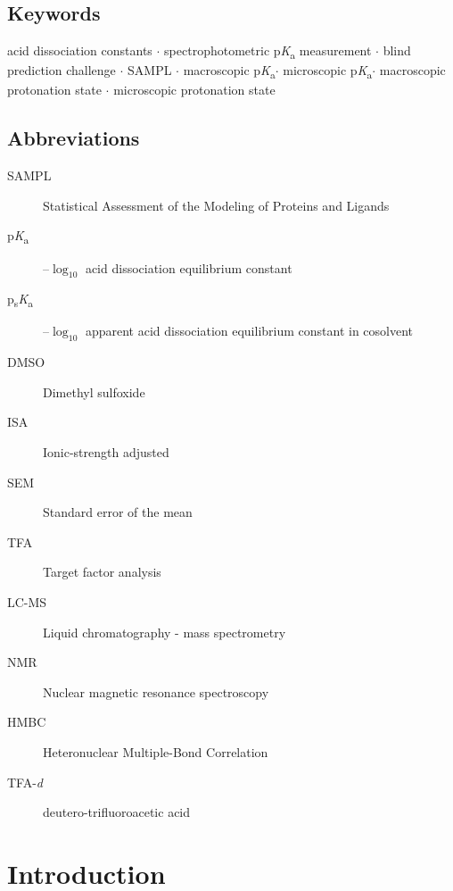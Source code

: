 \documentclass[9pt,lineno]{elife}
\newcommand{\pKa}{p\textit{K}\textsubscript{a}}
\newcommand{\psKa}{p\textsubscript{s}\textit{K}\textsubscript{a}}
\begin{document}
\subsection{Keywords}
acid dissociation constants $\cdot$ spectrophotometric \pKa{} measurement $\cdot$ blind prediction challenge $\cdot$ SAMPL $\cdot$ macroscopic \pKa $\cdot$ microscopic \pKa  $\cdot$ macroscopic protonation state $\cdot$ microscopic protonation state

\subsection{Abbreviations}
\begin{description}
\item[SAMPL] Statistical Assessment of the Modeling of Proteins and Ligands
\item[\pKa]  --${\log_{10}}$ acid dissociation equilibrium constant 
\item[\psKa] --${\log_{10}}$ apparent acid dissociation equilibrium constant in cosolvent
\item[DMSO] Dimethyl sulfoxide
\item[ISA] Ionic-strength adjusted
\item[SEM] Standard error of the mean
\item[TFA] Target factor analysis
\item[LC-MS] Liquid chromatography - mass spectrometry
\item[NMR] Nuclear magnetic resonance spectroscopy
\item[HMBC] Heteronuclear Multiple-Bond Correlation
\item[TFA-\textit{d}] deutero-trifluoroacetic acid
\end{description}

\section{Introduction}
\end{document}

